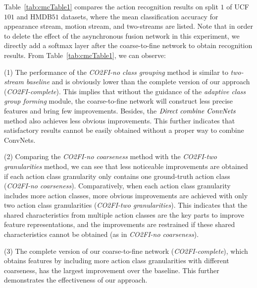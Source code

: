 \documentclass[letterpaper]{article} %
\begin{document}
{Table~\ref{tab:cmcTable1} compares the action recognition results on split $1$ of UCF$101$ and HMDB$51$ datasets, where the mean classification accuracy for appearance stream, motion stream, and two-streams are listed. Note that in order to delete the effect of the asynchronous fusion network in this experiment, we directly add a softmax layer after the coarse-to-fine network to obtain recognition results. From Table~\ref{tab:cmcTable1}, we can observe:

(1) The performance of the \emph{CO2FI-no class grouping} method is similar to \emph{two-stream baseline} and is obviously lower than the complete version of our approach (\emph{CO2FI-complete}). This implies that without the guidance of the \emph{adaptive class group forming} module, the coarse-to-fine network will construct less precise features and bring few improvements. Besides, the $\emph{Direct combine ConvNets}$ method also achieves less obvious improvements. This further indicates that satisfactory results cannot be easily obtained without a proper way to combine ConvNets.

(2) Comparing the \emph{CO2FI-no coarseness} method with the \emph{CO2FI-two granularities} method, we can see that less noticeable improvements are obtained if each action class granularity only contains one ground-truth action class (\emph{CO2FI-no coarseness}). Comparatively, when each action class granularity includes more action classes, more obvious improvements are achieved with only two action class granularities (\emph{CO2FI-two granularities}). This indicates that the shared characteristics from multiple action classes are the key parts to improve feature representations, and the improvements are restrained if these shared characteristics cannot be obtained (as in \emph{CO2FI-no coarseness}).

(3) The complete version of our coarse-to-fine network (\emph{CO2FI-complete}), which obtains features by including more action class granularities with different coarseness, has the largest improvement over the baseline. This further demonstrates the effectiveness of our approach.





}
\end{document}
